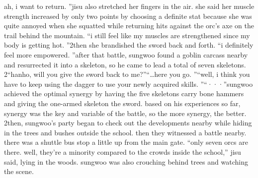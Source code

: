  ah, i want to return.
”jisu also stretched her fingers in the air.
 she said her muscle strength increased by only two points by choosing a definite stat because she was quite annoyed when she squatted while returning hits against the orc’s axe on the trail behind the mountain.
“i still feel like my muscles are strengthened since my body is getting hot.
”2then she brandished the sword back and forth.
“i definitely feel more empowered.
”after that battle, sungwoo found a goblin carcass nearby and resurrected it into a skeleton, so he came to lead a total of seven skeletons.
2“hanho, will you give the sword back to me?”“…here you go.
”“well, i think you have to keep using the dagger to use your newly acquired skills.
”“···”sungwoo achieved the optimal synergy by having the five skeletons carry bone hammers and giving the one-armed skeleton the sword.
based on his experiences so far, synergy was the key and variable of the battle, so the more synergy, the better.
2then, sungwoo’s party began to check out the developments nearby while hiding in the trees and bushes outside the school.
 then they witnessed a battle nearby.
 there was a shuttle bus stop a little up from the main gate.
“only seven orcs are there.
 well, they’re a minority compared to the crowds inside the school,” jisu said, lying in the woods.
 sungwoo was also crouching behind trees and watching the scene.

